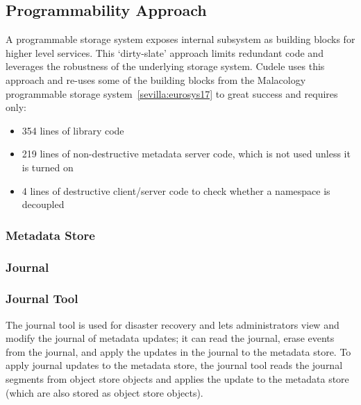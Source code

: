 \subsection{Programmability Approach}

A programmable storage system exposes internal subsystem as building blocks for
higher level services. This `dirty-slate' approach limits redundant code and
leverages the robustness of the underlying storage system. Cudele uses this
approach and re-uses some of the building blocks from the Malacology
programmable storage system~\ref{sevilla:eurosys17} to great success and
requires only:

\begin{itemize}

  \item 354 lines of library code

  \item 219 lines of non-destructive metadata server code, which is not used
  unless it is turned on

  \item 4 lines of destructive client/server code to check whether a namespace
  is decoupled

\end{itemize}

\subsubsection{Metadata Store}

\subsubsection{Journal}

\subsubsection{Journal Tool}
The journal tool is used for disaster recovery and lets administrators view and
modify the journal of metadata updates; it can read the journal, erase events
from the journal, and apply the updates in the journal to the metadata store.
To apply journal updates to the metadata store, the journal tool reads the
journal segments from object store objects and applies the update to the
metadata store (which are also stored as object store objects).  

